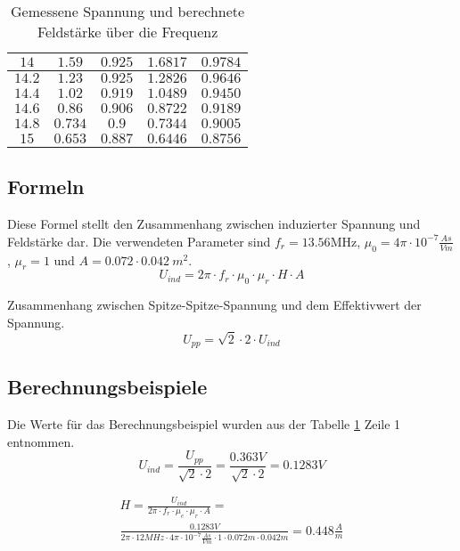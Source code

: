 \documentclass[12pt,a4paper,ngerman]{article}
\begin{document}
\begin{table}[H]
\begin{center}
\begin{tabular}{ |c|c|c|c|c| }
      \hline
  $14$ & $1.59$ & $0.925$ & $1.6817$ & $0.9784$ \\
      \hline
  $14.2$ & $1.23$ & $0.925$ & $1.2826$ & $0.9646$ \\
      \hline
  $14.4$ & $1.02$ & $0.919$ & $1.0489$ & $0.9450$ \\
      \hline
  $14.6$ & $0.86$ & $0.906$ & $0.8722$ & $0.9189$ \\
      \hline
  $14.8$ & $0.734$ & $0.9$ & $0.7344$ & $0.9005$ \\
      \hline
  $15$ & $0.653$ & $0.887$ & $0.6446$ & $0.8756$ \\
      \hline
\end{tabular}
\caption{Gemessene Spannung und berechnete Feldstärke über die Frequenz}
\label{tab:2}
\end{center}
\end{table}
\subsection{Formeln}
Diese Formel stellt den Zusammenhang zwischen induzierter Spannung und Feldstärke dar. Die verwendeten Parameter sind $f_r = 13.56$MHz, $\mu_0 = 4\pi \cdot 10^{-7}\frac{As}{Vm}$, $\mu_r = 1$ und $A = 0.072 \cdot 0.042\ m^2$.
\begin{equation}
U_{ind} = 2\pi \cdot f_r \cdot \mu_0 \cdot \mu_r \cdot H \cdot A
\end{equation}

Zusammenhang zwischen Spitze-Spitze-Spannung und dem Effektivwert der Spannung.
\begin{equation}
U_{pp} = \sqrt{2}  \cdot 2 \cdot U_{ind}
\end{equation}
\pagebreak
\subsection{Berechnungsbeispiele}
Die Werte für das Berechnungsbeispiel wurden aus der Tabelle \ref{tab:2} Zeile 1 entnommen.
\begin{equation}
U_{ind} = \frac{U_{pp}}{\sqrt{2}  \cdot 2} = \frac{0.363V}{\sqrt{2}  \cdot 2} = 0.1283 V
\end{equation}

\begin{gather}
H = \frac{U_{ind}}{2\pi \cdot f_r \cdot \mu_e \cdot \mu_r \cdot A} = \\
\frac{0.1283V}{2\pi \cdot 12MHz \cdot 4\pi \cdot 10^{-7}\frac{As}{Vm} \cdot 1 \cdot 0.072m \cdot 0.042m} = 0.448\frac{A}{m}
\end{gather}
\end{document}
